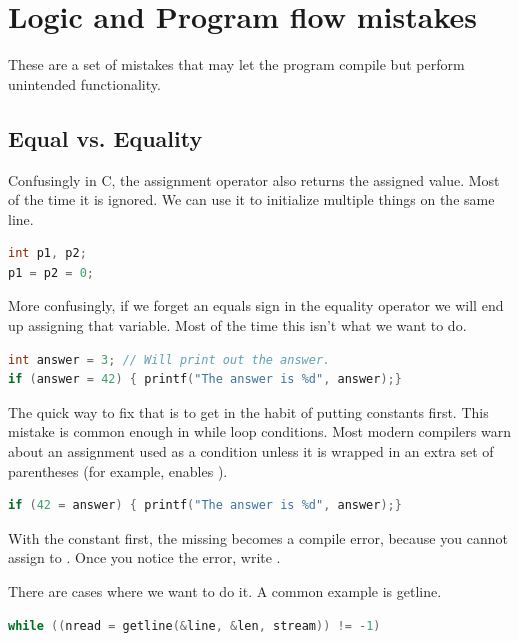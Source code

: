 \section{Logic and Program flow mistakes}

These are a set of mistakes that may let the program compile but perform unintended functionality.

\subsection{Equal vs. Equality}

Confusingly in C, the assignment operator also returns the assigned value.
Most of the time it is ignored.
We can use it to initialize multiple things on the same line.

\begin{lstlisting}[language=C]
int p1, p2;
p1 = p2 = 0;
\end{lstlisting}

More confusingly, if we forget an equals sign in the equality operator we will end up assigning that variable.
Most of the time this isn't what we want to do.

\begin{lstlisting}[language=C]
int answer = 3; // Will print out the answer.
if (answer = 42) { printf("The answer is %d", answer);}
\end{lstlisting}

The quick way to fix that is to get in the habit of putting constants first.
This mistake is common enough in while loop conditions.
Most modern compilers warn about an assignment used as a condition unless it is wrapped in an extra set of parentheses (for example,  enables ).

\begin{lstlisting}[language=C]
  if (42 = answer) { printf("The answer is %d", answer);}
\end{lstlisting}

With the constant first, the missing \keyword{=} becomes a compile error, because you cannot assign to .
Once you notice the error, write .

There are cases where we want to do it.
A common example is getline.

\begin{lstlisting}[language=C]
while ((nread = getline(&line, &len, stream)) != -1)
\end{lstlisting}

